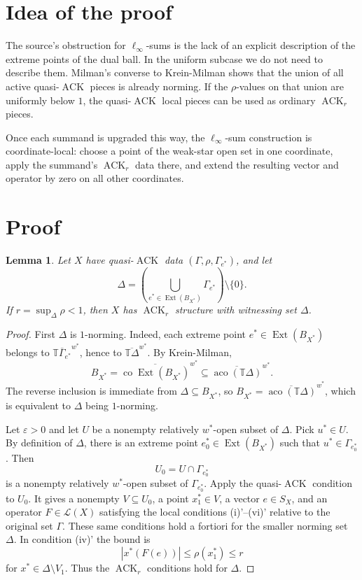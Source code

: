 \documentclass[11pt]{article}
\newtheorem{lemma}{Lemma}
\newcommand{\ACK}{\operatorname{ACK}}
\newcommand{\Ext}{\operatorname{Ext}}
\newcommand{\aco}{\operatorname{aco}}
\newcommand{\Lin}{\mathcal L}
\newcommand{\T}{\mathbb T}
\newcommand{\eps}{\varepsilon}
\begin{document}
\section*{Idea of the proof}

The source's obstruction for \(\ell_\infty\)-sums is the lack of an explicit
description of the extreme points of the dual ball.  In the uniform subcase we
do not need to describe them.  Milman's converse to Krein-Milman shows that the
union of all active quasi-\(\ACK\) pieces is already norming.  If the
\(\rho\)-values on that union are uniformly below \(1\), the quasi-\(\ACK\)
local pieces can be used as ordinary \(\ACK_r\) pieces.

Once each summand is upgraded this way, the \(\ell_\infty\)-sum construction is
coordinate-local: choose a point of the weak-star open set in one coordinate,
apply the summand's \(\ACK_r\) data there, and extend the resulting vector and
operator by zero on all other coordinates.

\section*{Proof}

\begin{lemma}\label{lem:active}
Let \(X\) have quasi-\(\ACK\) data
\((\Gamma,\rho,\Gamma_{e^*})\), and let
\[
\Delta=\left(\bigcup_{e^*\in\Ext(B_{X^*})}\Gamma_{e^*}\right)\setminus\{0\}.
\]
If \(r=\sup_{\Delta}\rho<1\), then \(X\) has \(\ACK_r\) structure with
witnessing set \(\Delta\).
\end{lemma}

\begin{proof}
First \(\Delta\) is \(1\)-norming.  Indeed, each extreme point
\(e^*\in\Ext(B_{X^*})\) belongs to
\(\overline{\T\Gamma_{e^*}}^{w^*}\), hence to
\(\overline{\T\Delta}^{w^*}\).  By Krein-Milman,
\[
B_{X^*}=\overline{\operatorname{co}\Ext(B_{X^*})}^{w^*}
\subseteq \overline{\aco(\T\Delta)}^{w^*}.
\]
The reverse inclusion is immediate from \(\Delta\subseteq B_{X^*}\), so
\(B_{X^*}=\overline{\aco(\T\Delta)}^{w^*}\), which is equivalent to
\(\Delta\) being \(1\)-norming.

Let \(\eps>0\) and let \(U\) be a nonempty relatively \(w^*\)-open subset of
\(\Delta\).  Pick \(u^*\in U\).  By definition of \(\Delta\), there is an
extreme point \(e_0^*\in\Ext(B_{X^*})\) such that
\(u^*\in\Gamma_{e_0^*}\).  Then
\[
U_0=U\cap \Gamma_{e_0^*}
\]
is a nonempty relatively \(w^*\)-open subset of \(\Gamma_{e_0^*}\).  Apply the
quasi-\(\ACK\) condition to \(U_0\).  It gives a nonempty
\(V\subseteq U_0\), a point \(x_1^*\in V\), a vector \(e\in S_X\), and an
operator \(F\in\Lin(X)\) satisfying the local conditions (i)'--(vi)' relative
to the original set \(\Gamma\).  These same conditions hold a fortiori for the
smaller norming set \(\Delta\).  In condition (iv)' the bound is
\[
|x^*(F(e))|\leq \rho(x_1^*)\leq r
\]
for \(x^*\in\Delta\setminus V_1\).  Thus the \(\ACK_r\) conditions hold for
\(\Delta\).
\end{proof}
\end{document}
